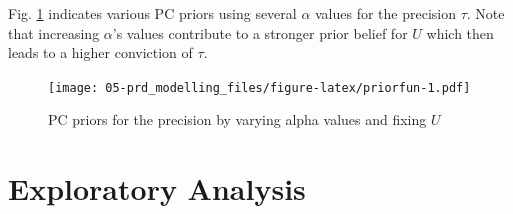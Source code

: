 \documentclass[
  12pt,
  a4paper,
  oneside]{book}
\theoremstyle{definition}
\theoremstyle{definition}
\theoremstyle{definition}
\theoremstyle{remark}
\begin{document}
Fig. \ref{fig:priorfun} indicates various PC priors using several \(\alpha\) values for the precision \(\tau\). Note that increasing \(\alpha\)'s values contribute to a stronger prior belief for \(U\) which then leads to a higher conviction of \(\tau\).

\begin{figure}
\centering
\texttt{[image: 05-prd\_modelling\_files/figure-latex/priorfun-1.pdf]}
\caption{\label{fig:priorfun}PC priors for the precision by varying alpha values and fixing \(U\)}
\end{figure}

\hypertarget{exploratory}{%
\chapter{Exploratory Analysis}\label{exploratory}}
\end{document}
